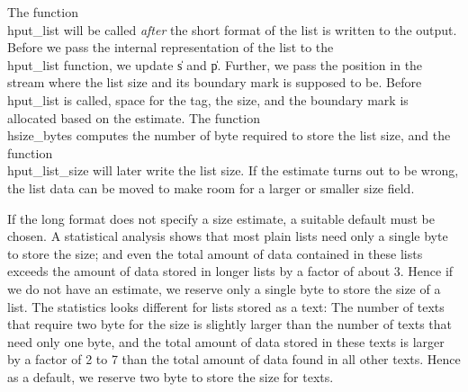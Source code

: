 The function \\{hput\_list} will be called {\it after} the short format
of the list is written to the output.  Before we pass the internal
representation of the list to the \\{hput\_list}
function, we update \|s and \|p. Further, we pass the position in the stream where the
list size and its boundary mark is supposed to be.
Before \\{hput\_list} is called, space for the tag, the size, and the boundary mark
is allocated based on the estimate. The function
\\{hsize\_bytes} computes the number of byte required to store the list
size, and the function \\{hput\_list\_size} will later write the list
size.  If the estimate turns out to be wrong, the list data can be moved
to make room for a larger or smaller size field.


If the long format does not specify a size estimate, a suitable default must be chosen.
A statistical analysis shows
%
%
%
that most plain lists need only a single byte to store the size; and even the
total amount of data contained in these lists exceeds the amount of data stored
in longer lists by a factor of about 3. Hence if we do not have an estimate,
we reserve only a single byte to store the size of a list.
The statistics looks different for lists stored as a text: The number of texts
that require two byte for the size is slightly larger than the number of texts that
need only one byte, and the total amount of data stored in these texts is larger by a factor of 2 to 7
than the total amount of data found in all other texts.
Hence as a default, we reserve two byte to store the size for texts.


